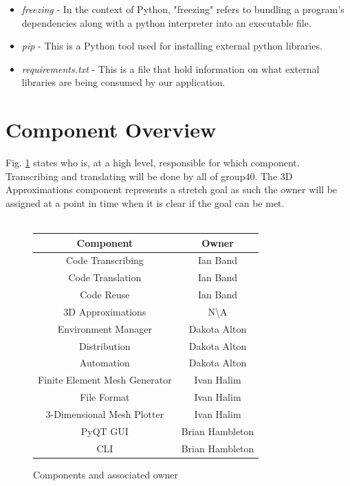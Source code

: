 \documentclass[onecolumn, draftclsnofoot,10pt, compsoc]{IEEEtran}
\begin{document}
\begin{itemize}
    \item \textit{freezing} - In the context of Python, "freezing" refers to bundling a program's dependencies along with a python interpreter into an executable file. 
    \item \textit{pip} - This is a Python tool used for installing external python libraries. 
    \item \textit{requirements.txt} - This is a file that hold information on what external libraries are being consumed by our application. 
\end{itemize}{}

\section{Component Overview}
Fig. \ref{fig:comp-own} states who is, at a high level, responsible for which component. Transcribing and translating will be done by all of group40. The 3D Approximations component represents a stretch goal as such the owner will be assigned at a point in time when it is clear if the goal can be met. \\\\
\begin{figure}[H]
    \centering
    \begin{tabular}{|c|c|}
        \hline
         Component & Owner \\\hline
         Code Transcribing & Ian Band \\\hline
         Code Translation & Ian Band \\\hline
         Code Reuse & Ian Band \\\hline
         3D Approximations & N\textbackslash A \\\hline
         Environment Manager & Dakota Alton \\\hline
         Distribution & Dakota Alton \\\hline
         Automation & Dakota Alton \\\hline
         Finite Element Mesh Generator & Ivan Halim \\\hline
         File Format & Ivan Halim \\\hline
         3-Dimensional Mesh Plotter & Ivan Halim \\\hline
         PyQT GUI & Brian Hambleton \\\hline
         CLI & Brian Hambleton \\\hline
    \end{tabular}{}
    \caption{Components and associated owner}
    \label{fig:comp-own}
\end{figure}{}
\end{document}
